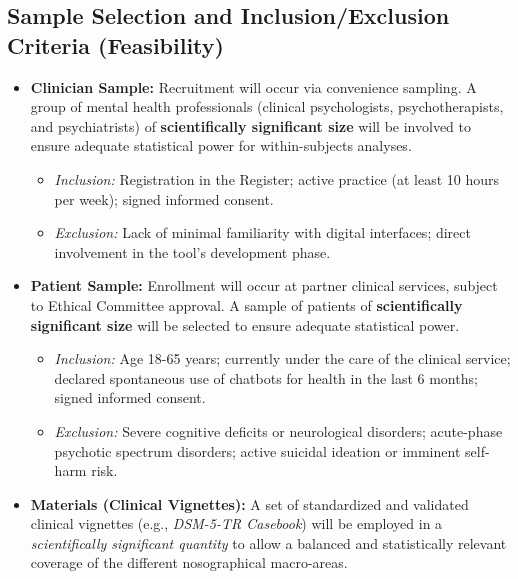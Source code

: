 \documentclass[11pt,a4paper]{article}
\begin{document}
\subsection{Sample Selection and Inclusion/Exclusion Criteria (Feasibility)}
\begin{itemize}
    \item \textbf{Clinician Sample:} Recruitment will occur via convenience sampling. A group of mental health professionals (clinical psychologists, psychotherapists, and psychiatrists) of \textbf{scientifically significant size} will be involved to ensure adequate statistical power for within-subjects analyses.
    \begin{itemize}
        \item \textit{Inclusion:} Registration in the Register; active practice (at least 10 hours per week); signed informed consent.
        \item \textit{Exclusion:} Lack of minimal familiarity with digital interfaces; direct involvement in the tool's development phase.
    \end{itemize}
    
    \item \textbf{Patient Sample:} Enrollment will occur at partner clinical services, subject to Ethical Committee approval. A sample of patients of \textbf{scientifically significant size} will be selected to ensure adequate statistical power.
    \begin{itemize}
        \item \textit{Inclusion:} Age 18-65 years; currently under the care of the clinical service; declared spontaneous use of chatbots for health in the last 6 months; signed informed consent.
        \item \textit{Exclusion:} Severe cognitive deficits or neurological disorders; acute-phase psychotic spectrum disorders; active suicidal ideation or imminent self-harm risk.
    \end{itemize}
    
    \item \textbf{Materials (Clinical Vignettes):} A set of standardized and validated clinical vignettes (e.g., \textit{DSM-5-TR Casebook}) will be employed in a \textit{scientifically significant quantity} to allow a balanced and statistically relevant coverage of the different nosographical macro-areas.
\end{itemize}
\end{document}
